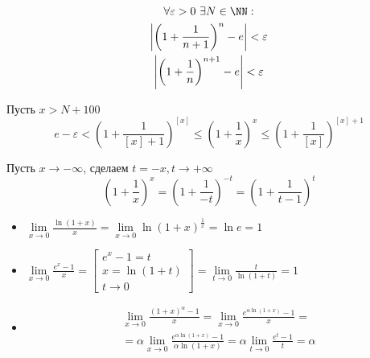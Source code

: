 \begin{gather*}
    \forall \varepsilon > 0 \ \exists N \in \NN :
    \\
    \left| \left( 1 + \frac{1}{n + 1} \right)^{n} - e \right| < \varepsilon
    \\
    \left| \left( 1 + \frac{1}{n} \right)^{n + 1} - e \right| < \varepsilon
\end{gather*}

Пусть \( x > N + 100 \)
\[
    e - \varepsilon 
    < 
    \left( 1 + \frac{1}{[x] + 1} \right)^{[x]} 
    \leq
    \left( 1 + \frac{1}{x} \right)^x
    \leq
    \left( 1 + \frac{1}{[x]} \right)^{[x] + 1}
\]

Пусть \( x \to -\infty \), сделаем \( t = -x, t \to +\infty \)
\[
    \left( 1 + \frac{1}{x} \right)^x = \left( 1 + \frac{1}{-t} \right)^{-t} = \left( 1 + \frac{1}{t - 1} \right)^t 
\]

\begin{example}{}{}
    \begin{itemize}
        \item
            \(
                \displaystyle
                \lim\limits_{x \to 0} \frac{\ln (1 + x)}{x} = \lim\limits_{x \to 0} \ln (1 + x)^{\frac{1}{x}} = \ln e = 1
            \)
        \item
            \(
                \displaystyle
                \lim\limits_{x \to 0} \frac{e^x - 1}{x} = 
                \left[
                    \begin{gathered}
                        e^x - 1 = t
                        \\
                        x = \ln (1 + t)
                        \\
                        t \to 0
                    \end{gathered}
                \right]
                =
                \lim\limits_{t \to 0}\frac{t}{\ln (1 + t)} = 1
            \)
        \item
            \begin{gather*}
                \lim\limits_{x \to 0} \frac{(1 + x)^{\alpha} - 1}{x}
                =
                \lim\limits_{x \to 0} \frac{e^{\alpha \ln (1 + x)} - 1}{x}
                =
                \\
                =
                \alpha \lim\limits_{x \to 0} \frac{e^{\alpha \ln (1 + x)} - 1}{\alpha \ln (1 + x)}
                =
                \alpha \lim\limits_{t \to 0} \frac{e^t - 1}{t} = \alpha
            \end{gather*}
    \end{itemize}
\end{example}

